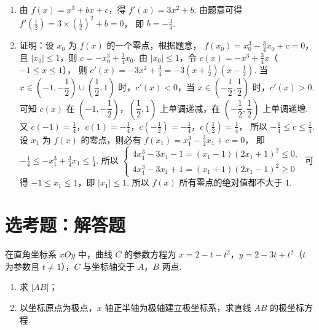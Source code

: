 \begin{solution}
\begin{enumerate}
\item 由 \(f(x)=x^3+bx+c\)，得
\(f'(x)=3x^2+b\).
由题意可得
\(f'\left( \frac{1}{2} \right)=3\times\left( \frac{1}{2} \right)^2+b=0\)，
即
\(b=-\frac{3}{4}\).

\item 证明：设 \(x_0\) 为 \(f(x)\) 的一个零点，根据题意，
\(f(x_0)=x_0^3-\frac{3}{4}x_0+c=0\)，
且 \(|x_0|\le1\)，则
\(c=-x_0^3+\frac{3}{4}x_0\).
由 \(|x_0|\le1\)，令
\(c(x)=-x^3+\frac{3}{4}x\)（\(-1\le x\le1\)），
则
\(c'(x)=-3x^2+\frac{3}{4}=-3\left( x+\frac{1}{2} \right)\left( x-\frac{1}{2} \right)\).
当 \(x\in\left( -1,-\dfrac{1}{2} \right)\cup\left( \dfrac{1}{2},1 \right)\) 时，\(c'(x)<0\)，当 \(x\in\left( -\dfrac{1}{2},\dfrac{1}{2} \right)\) 时，\(c'(x)>0\).
可知 \(c(x)\) 在 \(\left( -1,-\dfrac{1}{2} \right)\)，\(\left( \dfrac{1}{2},1 \right)\) 上单调递减，在 \(\left( -\dfrac{1}{2},\dfrac{1}{2} \right)\) 上单调递增.
又 \(c(-1)=\frac{1}{4}\)，\(c(1)=-\frac{1}{4}\)，\(c\left( -\frac{1}{2} \right)=-\frac{1}{4}\)，\(c\left( \frac{1}{2} \right)=\frac{1}{4}\)，
所以
\(-\frac{1}{4}\le c\le\frac{1}{4}\).
设 \(x_1\) 为 \(f(x)\) 的零点，则必有
\(f(x_1)=x_1^3-\frac{3}{4}x_1+c=0\)，
即
\(-\frac{1}{4}\le -x_1^3+\frac{3}{4}x_1\le\frac{1}{4}\).
所以 \(\begin{cases}
4x_1^3-3x_1-1=(x_1-1)(2x_1+1)^2\le0,\\
4x_1^3-3x_1+1=(x_1+1)(2x_1-1)^2\ge0
\end{cases}\)
可得 \(-1\le x_1\le1\)，即 \(|x_1|\le1\).
所以 \(f(x)\) 所有零点的绝对值都不大于 \(1\).
\end{enumerate}
\end{solution}

\section{选考题：解答题}

\begin{problem}
在直角坐标系 \(xOy\) 中，曲线 \(C\) 的参数方程为 \(x=2-t-t^2\)，\(y=2-3t+t^2\)（\(t\) 为参数且 \(t\ne1\)），\(C\) 与坐标轴交于 \(A\)，\(B\) 两点.

\begin{enumerate}
\item 求 \(|AB|\)；
\item 以坐标原点为极点，\(x\) 轴正半轴为极轴建立极坐标系，求直线 \(AB\) 的极坐标方程.
\end{enumerate}
\end{problem}

